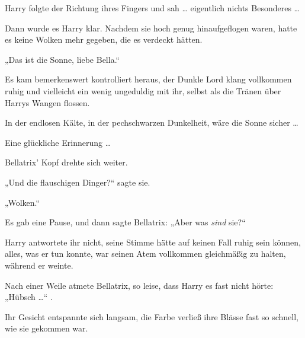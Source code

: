 Harry folgte der Richtung ihres Fingers und sah … eigentlich nichts Besonderes …

Dann wurde es Harry klar. Nachdem sie hoch genug hinaufgeflogen waren, hatte es keine Wolken mehr gegeben, die es verdeckt hätten.

„Das ist die Sonne, liebe Bella.“

Es kam bemerkenswert kontrolliert heraus, der Dunkle Lord klang vollkommen ruhig und vielleicht ein wenig ungeduldig mit ihr, selbst als die Tränen über Harrys Wangen flossen.

In der endlosen Kälte, in der pechschwarzen Dunkelheit, wäre die Sonne sicher …

Eine glückliche Erinnerung …

Bellatrix’ Kopf drehte sich weiter.

„Und die flauschigen Dinger?“ sagte sie.

„Wolken.“

Es gab eine Pause, und dann sagte Bellatrix:
„Aber was \emph{sind} sie?“

Harry antwortete ihr nicht, seine Stimme hätte auf keinen Fall ruhig sein können, alles, was er tun konnte, war seinen Atem vollkommen gleichmäßig zu halten, während er weinte.

Nach einer Weile atmete Bellatrix, so leise, dass Harry es fast nicht hörte:
„Hübsch …“ .

Ihr Gesicht entspannte sich langsam, die Farbe verließ ihre Blässe fast so schnell, wie sie gekommen war.

